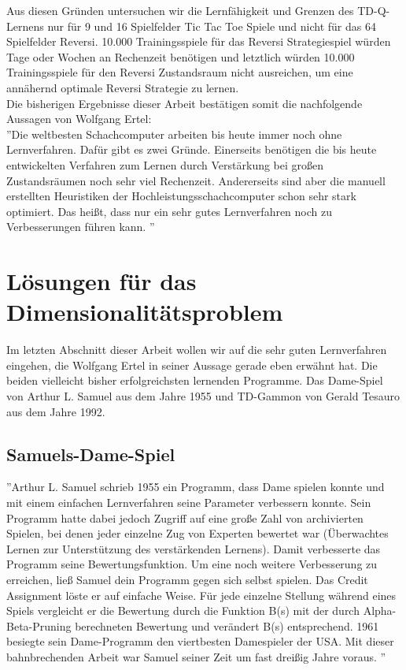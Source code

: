 Aus diesen Gründen untersuchen wir die Lernfähigkeit und Grenzen des TD-Q-Lernens nur für 9 und 16 Spielfelder Tic Tac Toe Spiele und nicht für das 64 Spielfelder Reversi. 10.000 Trainingsspiele für das Reversi Strategiespiel würden Tage oder Wochen an Rechenzeit benötigen und letztlich würden 10.000 Trainingsspiele für den Reversi Zustandsraum nicht ausreichen, um eine annähernd optimale Reversi Strategie zu lernen. \\

Die bisherigen Ergebnisse dieser Arbeit bestätigen somit die nachfolgende Aussagen von Wolfgang Ertel: \\

''Die weltbesten Schachcomputer arbeiten bis heute immer noch ohne Lernverfahren. Dafür gibt es zwei Gründe. Einerseits benötigen die bis heute entwickelten Verfahren zum Lernen durch Verstärkung bei großen Zustandsräumen noch sehr viel Rechenzeit. Andererseits sind aber die manuell erstellten Heuristiken der Hochleistungsschachcomputer schon sehr stark optimiert. Das heißt, dass nur ein sehr gutes Lernverfahren noch zu Verbesserungen führen kann. \cite[120]{Ertel}''\\

\section{Lösungen für das Dimensionalitätsproblem}
\label{sec:Ausblick}
Im letzten Abschnitt dieser Arbeit wollen wir auf die sehr guten Lernverfahren eingehen, die Wolfgang Ertel in seiner Aussage gerade eben erwähnt hat. Die beiden vielleicht bisher erfolgreichsten lernenden Programme. Das Dame-Spiel von Arthur L. Samuel aus dem Jahre 1955 und TD-Gammon von Gerald Tesauro aus dem Jahre 1992. 

\subsection{Samuels-Dame-Spiel}
''Arthur L. Samuel schrieb 1955 ein Programm, dass Dame spielen konnte und mit einem einfachen Lernverfahren seine Parameter verbessern konnte. Sein Programm hatte dabei jedoch Zugriff auf eine große Zahl von archivierten Spielen, bei denen jeder einzelne Zug von Experten bewertet war (Überwachtes Lernen zur Unterstützung des verstärkenden Lernens). Damit verbesserte das Programm seine Bewertungsfunktion. Um eine noch weitere Verbesserung zu erreichen, ließ Samuel dein Programm gegen sich selbst spielen. Das Credit Assignment löste er auf einfache Weise. Für jede einzelne Stellung während eines Spiels vergleicht er die Bewertung durch die Funktion B(s) mit der durch Alpha-Beta-Pruning berechneten Bewertung und verändert B(s) entsprechend. 1961 besiegte sein Dame-Programm den viertbesten Damespieler der USA. Mit dieser bahnbrechenden Arbeit war Samuel seiner Zeit um fast dreißig Jahre voraus. \cite[120\psq]{Ertel}''\\


